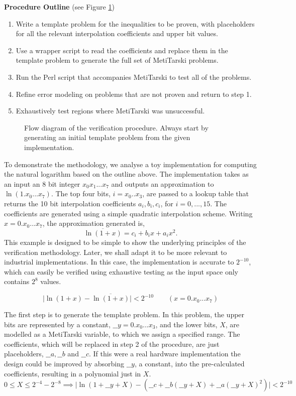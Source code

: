 \documentclass{fac}
\newcommand{\abs}[1]{\lvert#1\rvert}
\begin{document}
\noindent\textbf{Procedure Outline} (see Figure \ref{procedure_flow})
\begin{enumerate}
\item Write a template problem for the inequalities to be proven, with placeholders for all the relevant interpolation coefficients and upper bit values.
\item Use a wrapper script to read the coefficients and replace them in the template problem to generate the full set of MetiTarski problems.
\item Run the Perl script that accompanies MetiTarski to test all of the problems.
\item Refine error modeling on problems that are not proven and return to step 1.
\item Exhaustively test regions where MetiTarski was unsuccessful.
\end{enumerate}  

\begin{figure} 
\centering

\caption{Flow diagram of the verification procedure. Always start by generating an initial template problem from the given implementation.}
\label{procedure_flow}
\end{figure}

To demonstrate the methodology, we analyse a toy implementation for computing the natural logarithm based on the outline above. The implementation takes as an input an 8 bit integer $x_0x_1...x_7$ and outputs an approximation to $\ln(1.x_0...x_7)$. The top four bits, $i = x_0..x_3$, are passed to a lookup table that returns the 10 bit interpolation coefficients $a_i, b_i, c_i$, for $i=0,...,15$. The coefficients are generated using a simple quadratic interpolation scheme. Writing $x=0.x_0...x_7$, the approximation generated is,
\[ \overline{\ln(1+x)}=c_i + b_i x +a_i x^2. \]
This example is designed to be simple to show the underlying principles of the verification methodology. Later, we shall adapt it to be more relevant to industrial implementations. In this case, the implementation is accurate to $2^{-10}$, which can easily be verified using exhaustive testing as the input space only contains $2^8$ values.

\[\abs{\ln(1+x)-\overline{\ln(1+x)}} <2^{-10} \qquad (x= 0.x_0...x_7) \]

The first step is to generate the template problem. In this problem, the upper bits are represented by a constant, $\_\_y=0.x_0...x_3$, and the lower bits, $X$, are modelled as a MetiTarski variable, to which we assign a specified range. The coefficients, which will be replaced in step 2 of the procedure, are just placeholders, $\_\_a, \_\_b$ and $\_\_c$. If this were a real hardware implementation the design could be improved by absorbing $\_\_y$, a constant, into the pre-calculated coefficients, resulting in a polynomial just in $X$.
\[ 0\le X \le 2^{-4}-2^{-8} \implies \abs{\ln(1+\_\_y+X)-(\_\_c+\_\_b(\_\_y+X)+\_\_a(\_\_y+X)^2)} < 2^{-10} \]
\end{document}
